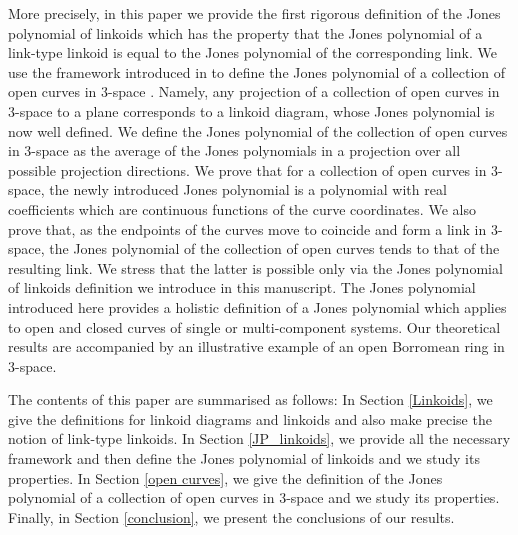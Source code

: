 \documentclass{article}
\begin{document}
More precisely, in this paper we provide the first rigorous definition of the Jones polynomial of linkoids which has the property that the Jones polynomial of a link-type linkoid is equal to the Jones polynomial of the corresponding link. We use the framework introduced in \cite{Panagiotou2020b} to define the Jones polynomial of a collection of open curves in 3-space \cite{Panagiotou2020b}. Namely, any projection of a collection of open curves in 3-space to a plane corresponds to a linkoid diagram, whose Jones polynomial is now well defined. We define the Jones polynomial of the collection of open curves in 3-space as the average of the Jones polynomials in a projection over all possible projection directions. We prove that for a collection of open curves in 3-space, the newly introduced Jones polynomial is a polynomial with real coefficients which are continuous functions of the curve coordinates. We also prove that, as the endpoints of the curves move to coincide and form a link in 3-space, the Jones polynomial of the collection of open curves tends to that of the resulting link. We stress that the latter is possible only via the Jones polynomial of linkoids definition we introduce in this manuscript. The Jones polynomial introduced here provides a holistic definition of a Jones polynomial which applies to open and closed curves of single or multi-component systems. Our theoretical results are accompanied by an illustrative example of an open Borromean ring in 3-space. %

The contents of this paper are summarised as follows: In Section \ref{Linkoids}, we give the definitions for linkoid diagrams and linkoids and also make precise the notion of link-type linkoids. In Section \ref{JP_linkoids}, we provide all the necessary framework and then define the Jones polynomial of linkoids and we study its properties. In Section \ref{open curves}, we give the definition of the Jones polynomial of a collection of open curves in 3-space and we study its properties. Finally, in Section \ref{conclusion}, we present the conclusions of our results.

\end{document}

